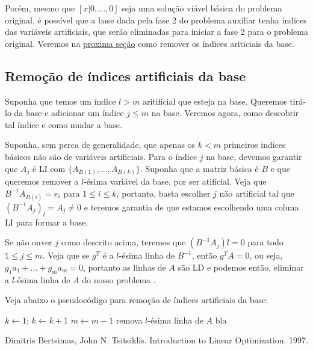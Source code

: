 \documentclass[12pt]{article}
\begin{document}
Porém, mesmo que $[x | 0, ..., 0]$ seja uma solução viável básica do problema original, é possível que a base dada pela fase 2 do problema auxiliar tenha índices das variáveis artificiais, que serão eliminadas para iniciar a fase 2 para o problema original. Veremos na \hyperref[rm_artificiais]{proxima seção} como remover os índices ariticiais da base.

\subsection{Remoção de índices artificiais da base}
\label{fase2:rm_artificiais}
Suponha que temos um índice $l > m$ aritificial que esteja na base. Queremos tirá-lo da base e adicionar um índice $j \leq m$ na base. Veremos agora, como descobrir tal índice e como mudar a base.

Suponha, sem perca de generalidade, que apenas os $k < m$ primeiros indices básicos não são de variáveis artificiais. Para o índice $j$ na base, devemos garantir que $A_{j}$ é LI com $\{A_{B(1)}, ..., A_{B(k)}\}$. Suponha que a matriz básica é $B$ e que queremos remover a $l$-ésima variável da base, por ser atificial. Veja que $B^{-1}A_{B(i)} = e_i$ para $1 \leq i \leq k$, portanto, basta escolher $j$ não artificial tal que $(B^{-1}A_j)_l = A_j  \neq 0$ e teremos garantia de que estamos escolhendo uma coluna LI para formar a base.

Se não ouver $j$ como descrito acima, teremos que $(B^{-1}A_j)l = 0$ para todo $1 \leq j \leq m$. Veja que se $g^T$ é a $l$-ésima linha de $B^{-1}$, então $g^TA = 0$, ou seja, $g_1a_1 + ... + g_ma_m = 0$, portanto as linhas de $A$ são LD e podemos então, eliminar a $l$-ésima linha de $A$ do nosso problema \cite{315book}.

Veja abaixo o pseudocódigo para remoção de índices artificiais da base:
\bigskip

\begin{algorithmic}
		\State $k \gets 1$;
			\State $k \gets k + 1$
		\EndWhile
			\State $m \gets m - 1$
			\State remova $l$-ésima linha de $A$
		\Else
			\State bla
		\EndIf
	\EndFor
\EndFunction
\end{algorithmic}
	

	

\newpage
\begin{thebibliography}{9}
 Dimitris Bertsimas, John N. Tsitsiklis. Introduction to Linear Optimization. 1997.
\end{thebibliography}
\end{document}
